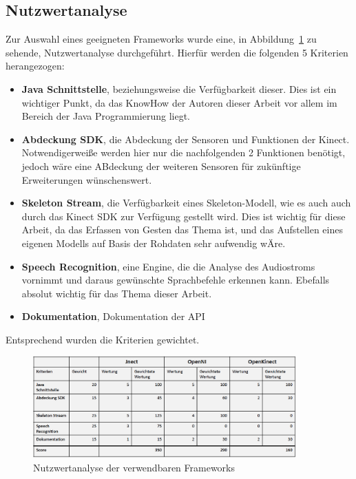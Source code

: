 \subsection{Nutzwertanalyse}

Zur Auswahl eines geeigneten Frameworks wurde eine, in Abbildung~\ref{fig:nutzwert} zu sehende, Nutzwertanalyse durchgef\"uhrt. 
Hierf\"ur werden die folgenden 5 Kriterien herangezogen:
\begin{itemize}
  \item \textbf{Java Schnittstelle}, beziehungsweise die Verf\"ugbarkeit dieser. Dies ist ein wichtiger Punkt, da das KnowHow der Autoren dieser Arbeit vor allem im Bereich der Java Programmierung liegt.
  \item \textbf{Abdeckung SDK}, die Abdeckung der Sensoren und Funktionen der Kinect. Notwendigerwei\ss e werden hier nur die nachfolgenden 2 Funktionen ben\"otigt, jedoch w\"are eine ABdeckung der weiteren Sensoren f\"ur zuk\"unftige Erweiterungen w\"unschenswert.
  \item \textbf{Skeleton Stream}, die Verf\"ugbarkeit eines Skeleton-Modell, wie es auch auch durch das Kinect SDK zur Verf\"ugung gestellt wird. Dies ist wichtig f\"ur diese Arbeit, da das Erfassen von Gesten das Thema ist, und das Aufstellen eines eigenen Modells auf Basis der Rohdaten sehr aufwendig w\"Are.
  \item \textbf{Speech Recognition}, eine Engine, die die Analyse des Audiostroms vornimmt und daraus gew\"unschte Sprachbefehle erkennen kann. Ebefalls absolut wichtig f\"ur das Thema dieser Arbeit.
  \item \textbf{Dokumentation}, Dokumentation der API
\end{itemize}
Entsprechend wurden die Kriterien gewichtet.
\begin{figure}[htb]
\centering
\includegraphics[width=0.9\textwidth]{img/04kapitel/nutzwert.png}
\caption[Nutzwertanalyse Frameworks]{Nutzwertanalyse der verwendbaren Frameworks}
\label{fig:nutzwert}
\end{figure}

